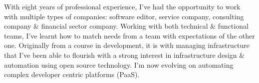 

\begin{cvparagraph}

With eight years of professional experience, I've had the opportunity to work with multiple types of companies: software editor, service company, consulting company \& financial sector company. Working with both technical \& functional teams, I've learnt how to match needs from a team with expectations of the other one.
Originally from a course in development, it is with managing infrastructure that I've been able to flourish with a strong interest in infrastructure design \& automation using open source technology.
I'm now evolving on automating complex developer centric platforms (PaaS).
\end{cvparagraph}
